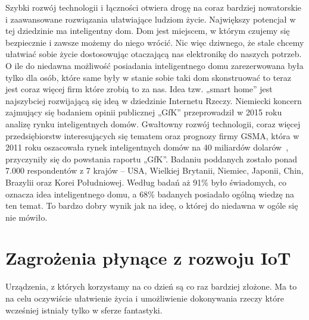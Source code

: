\documentclass[brudnopis]{xmgr}
\begin{document}
Szybki rozwój technologii i łączności otwiera drogę na coraz bardziej nowatorskie i zaawansowane rozwiązania ułatwiające ludziom życie. Największy potencjał w tej dziedzinie ma inteligentny dom. Dom jest miejscem, w którym czujemy się bezpiecznie i zawsze możemy do niego wrócić. Nic więc dziwnego, że stale chcemy ułatwiać sobie życie dostosowując otaczającą nas elektronikę do naszych potrzeb.
O ile do niedawna możliwość posiadania inteligentnego domu zarezerwowana była tylko dla osób, które same były w stanie sobie taki dom skonstruować to teraz jest coraz więcej firm które zrobią to za nas. Idea tzw. „smart home” jest najszybciej rozwijającą się ideą w dziedzinie Internetu Rzeczy. Niemiecki koncern zajmujący się badaniem opinii publicznej „GfK” przeprowadził w 2015 roku analizę rynku inteligentnych domów. Gwałtowny rozwój technologii, coraz więcej przedsiębiorstw interesujących się tematem oraz prognozy firmy GSMA, która w 2011 roku oszacowała rynek inteligentnych domów na 40 miliardów dolarów~\cite{Gsma:2011:CMC}, przyczyniły się do powstania raportu „GfK”. Badaniu poddanych zostało ponad 7.000 respondentów z 7 krajów – USA, Wielkiej Brytanii, Niemiec, Japonii, Chin, Brazylii oraz Korei Południowej. Według badań aż 91\% było świadomych, co oznacza idea inteligentnego domu, a 68\% badanych posiadało ogólną wiedzę na ten temat. To bardzo dobry wynik jak na ideę, o której do niedawna w ogóle się nie mówiło.

\section{Zagrożenia płynące z rozwoju IoT}
Urządzenia, z których korzystamy na co dzień są co raz bardziej złożone. Ma to na celu oczywiście ułatwienie życia i umożliwienie dokonywania rzeczy które wcześniej istniały tylko w sferze fantastyki. 
\end{document}
